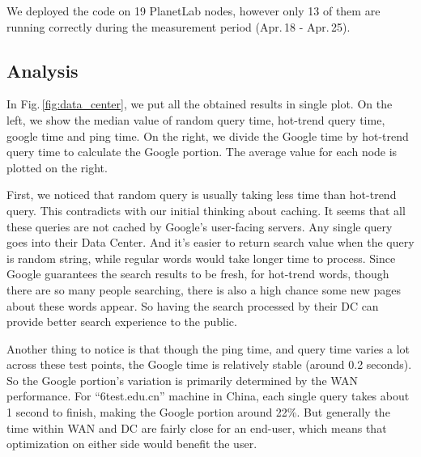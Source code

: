 We deployed the code on 19 PlanetLab nodes, however only 13 of them are running correctly during the measurement period (Apr.\,18 - Apr.\,25).

\subsection{Analysis}
\label{sec:analysis}

In Fig.\,\ref{fig:data_center}, we put all the obtained results in single plot. On the left, we show the median value of random query time, hot-trend query time, google time and ping time. On the right, we divide the Google time by hot-trend query time to calculate the Google portion. The average value for each node is plotted on the right.

First, we noticed that random query is usually taking less time than hot-trend query. This contradicts with our initial thinking about caching. It seems that all these queries are not cached by Google's user-facing servers. Any single query goes into their Data Center. And it's easier to return search value when the query is random string, while regular words would take longer time to process. Since Google guarantees the search results to be fresh, for hot-trend words, though there are so many people searching, there is also a high chance some new pages about these words appear. So having the search processed by their DC can provide better search experience to the public.

Another thing to notice is that though the ping time, and query time varies a lot across these test points, the Google time is relatively stable (around 0.2 seconds). So the Google portion's variation is primarily determined by the WAN performance. For ``6test.edu.cn'' machine in China, each single query takes about 1 second to finish, making the Google portion around 22\%. But generally the time within WAN and DC are fairly close for an end-user, which means that optimization on either side would benefit the user.

